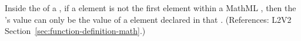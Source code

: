 Inside the  of a \FunctionDefinition, if a  element
is not the first element within a MathML , then the
's value can only be the value of a  element declared
in that .  (References: L2V2
Section~\ref{sec:function-definition-math}.)
